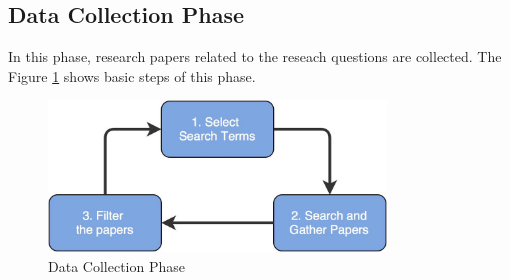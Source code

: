 \subsection{Data Collection Phase}\label{section:context/approach/data_collection_phase}
In this phase, research papers related to the reseach questions are collected. The Figure \ref{fig:context/data_collection_phase} shows basic steps of this phase.
\begin{figure}[H]
\begin{center}
\includegraphics[width=0.8\textwidth]{figures/introduction_data_collection_phase}
\caption{Data Collection Phase}
\label{fig:context/data_collection_phase}
\end{center}
\end{figure}

